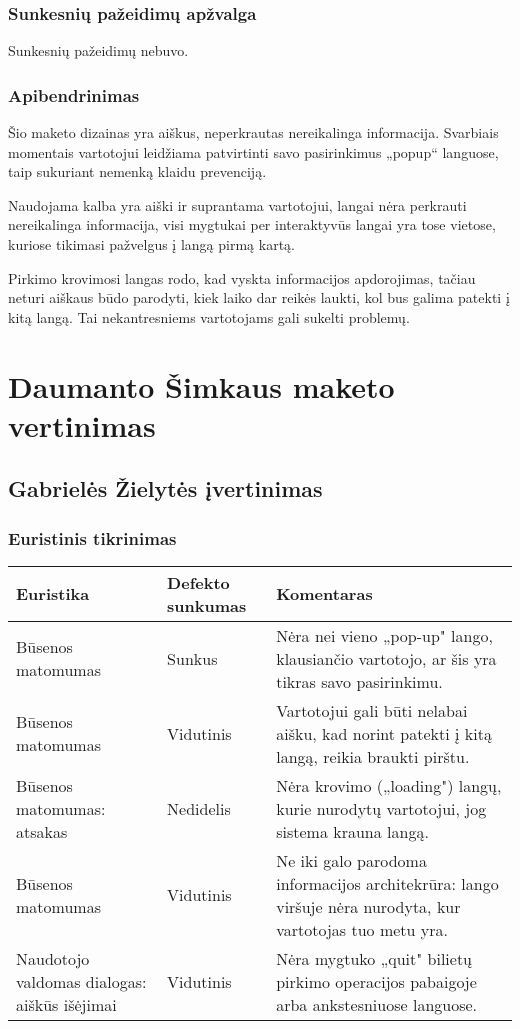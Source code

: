 \documentclass{VUMIFPSkursinis}
\begin{document}
\subsubsection{Sunkesnių pažeidimų apžvalga}
Sunkesnių pažeidimų nebuvo.

\subsubsection{Apibendrinimas}
Šio maketo dizainas yra aiškus, neperkrautas nereikalinga informacija. Svarbiais momentais vartotojui leidžiama patvirtinti savo pasirinkimus „popup“ languose, taip sukuriant nemenką klaidu prevenciją.

Naudojama kalba yra aiški ir suprantama vartotojui, langai nėra perkrauti nereikalinga informacija, visi mygtukai per interaktyvūs langai yra tose vietose, kuriose tikimasi pažvelgus į langą pirmą kartą.

Pirkimo krovimosi langas rodo, kad vyskta informacijos apdorojimas, tačiau neturi aiškaus būdo parodyti, kiek laiko dar reikės laukti, kol bus galima patekti į kitą langą. Tai nekantresniems vartotojams gali sukelti problemų.

\section{Daumanto Šimkaus maketo vertinimas}
\subsection{Gabrielės Žielytės įvertinimas}
\subsubsection{Euristinis tikrinimas}
\begin{center}
 \begin{tabular}{|| p{4cm} | p{4cm} | p{8cm} ||} 
 \hline
 Euristika & Defekto sunkumas & Komentaras \\
 \hline\hline
 Būsenos matomumas & Sunkus & Nėra nei vieno „pop-up" lango, klausiančio vartotojo, ar šis yra tikras savo pasirinkimu.\\ 
 \hline
 Būsenos matomumas & Vidutinis & Vartotojui gali būti nelabai aišku, kad norint patekti į kitą langą, reikia braukti pirštu.\\
 \hline
 Būsenos matomumas: atsakas & Nedidelis & Nėra krovimo („loading") langų, kurie nurodytų vartotojui, jog sistema krauna langą. \\
 \hline
 Būsenos matomumas & Vidutinis & Ne iki galo parodoma informacijos architekrūra: lango viršuje nėra nurodyta, kur vartotojas tuo metu yra. \\  
 \hline   
 Naudotojo valdomas dialogas: aiškūs išėjimai & Vidutinis & Nėra mygtuko „quit" bilietų pirkimo operacijos pabaigoje arba ankstesniuose languose. \\
 \hline              
\end{tabular}	
\end{center}
\end{document}
